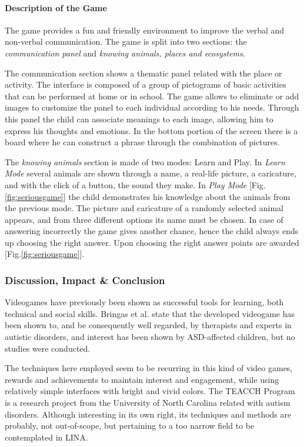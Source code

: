 \documentclass[runningheads]{llncs}
\begin{document}
\paragraph{Description of the Game} The game provides a fun and friendly environment to improve the verbal and non-verbal communication. The game is split into two sections: the \textit{communication panel} and \textit{knowing animals, places and ecosystems}.
\par The communication section shows a thematic panel related with the place or activity. The interface is composed of a group of pictograms of basic activities that can be performed at home or in school. The game allows to eliminate or add images to customize the panel to each individual according to his needs. Through this panel the child can associate meanings to each image, allowing him to express his thoughts and emotions. In the bottom portion of the screen there is a board where he can construct a phrase through the combination of pictures.
\par The \textit{knowing animals} section is made of two modes: Learn and Play. In \textit{Learn Mode} several animals are shown through a name, a real-life picture, a caricature, and with the click of a button, the sound they make. In \textit{Play Mode} [Fig.\ref{fig:seriousgame}] the child demonstrates his knowledge about the animals from the previous mode. The picture and caricature of a randomly selected animal appears, and from three different options its name must be chosen. In case of answering incorrectly the game gives another chance, hence the child always ends up choosing the right answer. Upon choosing the right answer points are awarded [Fig.\ref{fig:seriousgame}].



\subsubsection{Discussion, Impact \& Conclusion}
\par Videogames have previously been shown as successful tools for learning, both technical and social skills. Bringas et al. state that the developed videogame has been shown to, and be consequently well regarded, by therapists and experts in autistic disorders, and interest has been shown by ASD-affected children, but no studies were conducted.
\par The techniques here employed seem to be recurring in this kind of video games, rewards and achievements to maintain interest and engagement, while using relatively simple interfaces with bright and vivid colors. The TEACCH Program is a research project from the University of North Carolina related with autism disorders. Although interesting in its own right, its techniques and methods are probably, not out-of-scope, but pertaining to a too narrow field to be contemplated in LINA.
\end{document}
